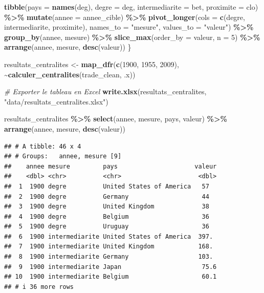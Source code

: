 \documentclass[
]{article}
\newenvironment{Shaded}{\begin{snugshade}}{\end{snugshade}}
\newcommand{\AttributeTok}[1]{\textcolor[rgb]{0.13,0.29,0.53}{#1}}
\newcommand{\CommentTok}[1]{\textcolor[rgb]{0.56,0.35,0.01}{\textit{#1}}}
\newcommand{\DecValTok}[1]{\textcolor[rgb]{0.00,0.00,0.81}{#1}}
\newcommand{\FunctionTok}[1]{\textcolor[rgb]{0.13,0.29,0.53}{\textbf{#1}}}
\newcommand{\NormalTok}[1]{#1}
\newcommand{\OtherTok}[1]{\textcolor[rgb]{0.56,0.35,0.01}{#1}}
\newcommand{\SpecialCharTok}[1]{\textcolor[rgb]{0.81,0.36,0.00}{\textbf{#1}}}
\newcommand{\StringTok}[1]{\textcolor[rgb]{0.31,0.60,0.02}{#1}}
\begin{document}
\begin{Shaded}
\begin{Highlighting}[]
  \FunctionTok{tibble}\NormalTok{(}\AttributeTok{pays =} \FunctionTok{names}\NormalTok{(deg), }\AttributeTok{degre =}\NormalTok{ deg, }\AttributeTok{intermediarite =}\NormalTok{ bet, }\AttributeTok{proximite =}\NormalTok{ clo) }\SpecialCharTok{\%\textgreater{}\%}
    \FunctionTok{mutate}\NormalTok{(}\AttributeTok{annee =}\NormalTok{ annee\_cible) }\SpecialCharTok{\%\textgreater{}\%}
    \FunctionTok{pivot\_longer}\NormalTok{(}\AttributeTok{cols =} \FunctionTok{c}\NormalTok{(degre, intermediarite, proximite), }\AttributeTok{names\_to =} \StringTok{"mesure"}\NormalTok{, }\AttributeTok{values\_to =} \StringTok{"valeur"}\NormalTok{) }\SpecialCharTok{\%\textgreater{}\%}
    \FunctionTok{group\_by}\NormalTok{(annee, mesure) }\SpecialCharTok{\%\textgreater{}\%}
    \FunctionTok{slice\_max}\NormalTok{(}\AttributeTok{order\_by =}\NormalTok{ valeur, }\AttributeTok{n =} \DecValTok{5}\NormalTok{) }\SpecialCharTok{\%\textgreater{}\%}
    \FunctionTok{arrange}\NormalTok{(annee, mesure, }\FunctionTok{desc}\NormalTok{(valeur))}
\NormalTok{\}}

\NormalTok{resultats\_centralites }\OtherTok{\textless{}{-}} \FunctionTok{map\_dfr}\NormalTok{(}\FunctionTok{c}\NormalTok{(}\DecValTok{1900}\NormalTok{, }\DecValTok{1955}\NormalTok{, }\DecValTok{2009}\NormalTok{), }\SpecialCharTok{\textasciitilde{}}\FunctionTok{calculer\_centralites}\NormalTok{(trade\_clean, .x))}


\CommentTok{\# Exporter le tableau en Excel}
\FunctionTok{write.xlsx}\NormalTok{(resultats\_centralites, }\StringTok{"data/resultats\_centralites.xlsx"}\NormalTok{)}

\NormalTok{resultats\_centralites }\SpecialCharTok{\%\textgreater{}\%}
  \FunctionTok{select}\NormalTok{(annee, mesure, pays, valeur) }\SpecialCharTok{\%\textgreater{}\%}
  \FunctionTok{arrange}\NormalTok{(annee, mesure, }\FunctionTok{desc}\NormalTok{(valeur))}
\end{Highlighting}
\end{Shaded}

\begin{verbatim}
## # A tibble: 46 x 4
## # Groups:   annee, mesure [9]
##    annee mesure         pays                     valeur
##    <dbl> <chr>          <chr>                     <dbl>
##  1  1900 degre          United States of America   57  
##  2  1900 degre          Germany                    44  
##  3  1900 degre          United Kingdom             38  
##  4  1900 degre          Belgium                    36  
##  5  1900 degre          Uruguay                    36  
##  6  1900 intermediarite United States of America  397. 
##  7  1900 intermediarite United Kingdom            168. 
##  8  1900 intermediarite Germany                   103. 
##  9  1900 intermediarite Japan                      75.6
## 10  1900 intermediarite Belgium                    60.1
## # i 36 more rows
\end{verbatim}
\end{document}

